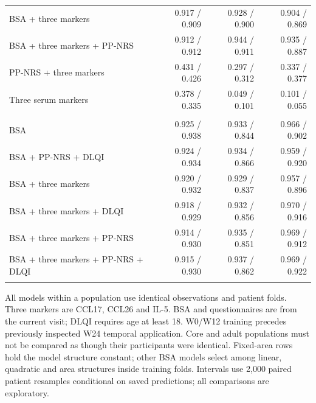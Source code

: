 {\begin{longtable}{p{53mm}rrr}
BSA + three markers & 0.917 / 0.909 & 0.928 / 0.900 & 0.904 / 0.869 \\
BSA + three markers + PP-NRS & 0.912 / 0.912 & 0.944 / 0.911 & 0.935 / 0.887 \\
PP-NRS + three markers & 0.431 / 0.426 & 0.297 / 0.312 & 0.337 / 0.377 \\
Three serum markers & 0.378 / 0.335 & 0.049 / 0.101 & 0.101 / 0.055 \\
\addlinespace
\multicolumn{4}{l}{Matched adult itch and DLQI population; n=105/58/44} \\
BSA & 0.925 / 0.938 & 0.933 / 0.844 & 0.966 / 0.902 \\
BSA + PP-NRS + DLQI & 0.924 / 0.934 & 0.934 / 0.866 & 0.959 / 0.920 \\
BSA + three markers & 0.920 / 0.932 & 0.929 / 0.837 & 0.957 / 0.896 \\
BSA + three markers + DLQI & 0.918 / 0.929 & 0.932 / 0.856 & 0.970 / 0.916 \\
BSA + three markers + PP-NRS & 0.914 / 0.930 & 0.935 / 0.851 & 0.969 / 0.912 \\
BSA + three markers + PP-NRS + DLQI & 0.915 / 0.930 & 0.937 / 0.862 & 0.969 / 0.922 \\
\addlinespace
\bottomrule\end{longtable}
}
\noindent\footnotesize All models within a population use identical observations and patient folds. Three markers are CCL17, CCL26 and IL-5. BSA and questionnaires are from the current visit; DLQI requires age at least 18. W0/W12 training precedes previously inspected W24 temporal application. Core and adult populations must not be compared as though their participants were identical. Fixed-area rows hold the model structure constant; other BSA models select among linear, quadratic and area structures inside training folds. Intervals use 2,000 paired patient resamples conditional on saved predictions; all comparisons are exploratory.\normalsize
